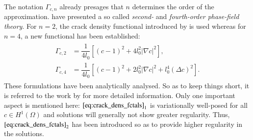 The notation $\Gamma_{c,n}$ already presages that $n$ determines the order of the approximation. \citet{02_PF_HO_brittle} have presented a so called \textit{second-} and \textit{fourth-order phase-field theory}. For $n=2$, the crack density functional introduced by \citet{08_PF_Gammac2} is used whereas for $n=4$, a new functional has been established:
\begin{align}
	\begin{aligned}   \label{eq:crack_dens_fctals}
		\Gamma_{c,2} &= \dfrac{1}{4l_{0}}\left[\left(c-1\right)^{2}+4l_{0}^{2}|\nabla c|^{2}\right], \\
		\Gamma_{c,4} &= \dfrac{1}{4l_{0}}\left[\left(c-1\right)^{2}+2l_{0}^{2}|\nabla c|^{2}+l_{0}^{4}\left(\Delta c\right)^{2}\right].
	\end{aligned}
\end{align}
These formulations have been analytically analysed. So as to keep things short, it is referred to the work by \citet{02_PF_HO_brittle} for more detailed information. Only one important aspect is mentioned here: ${\eqref{eq:crack_dens_fctals}}_{1}$ is variationally well-posed for all $c\in H^{1}\left(\Omega\right)$ and solutions will generally not show greater regularity. Thus, ${\eqref{eq:crack_dens_fctals}}_{2}$ has been introduced so as to provide higher regularity in the solutions.

